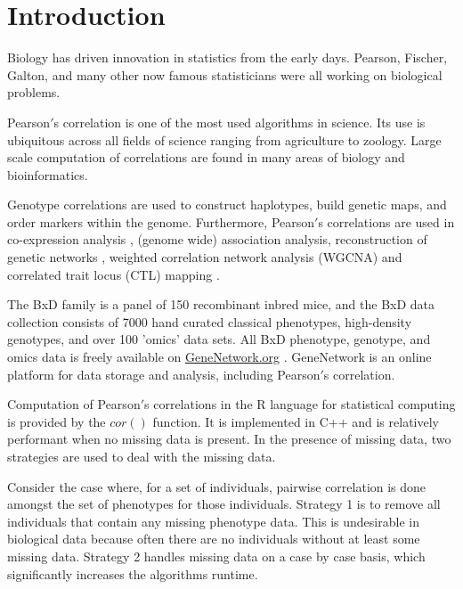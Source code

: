 \documentclass{bioinfo}
\begin{document}
\maketitle

\section{Introduction}
Biology has driven innovation in statistics from the early days. Pearson, Fischer, 
Galton, and many other now famous statisticians were all working on biological 
problems. 

\enlargethispage{12pt}

Pearson$'$s correlation is one of the most used algorithms in science. Its use is 
ubiquitous across all fields of science ranging from agriculture to zoology. Large 
scale computation of correlations are found in many areas of biology and 
bioinformatics. 

Genotype correlations are used to construct haplotypes, build genetic maps, and 
order markers within the genome. Furthermore, Pearson$'$s correlations are used in 
co-expression analysis \citep{Tesson:2010}, (genome wide) association analysis, 
reconstruction of genetic networks \citep{Fukushima:2013}, weighted correlation 
network analysis (WGCNA) \citep{Horvath:2008} and correlated trait locus (CTL) 
mapping \citep{Arends2016a}.

The BxD family is a panel of 150 recombinant inbred mice, and the BxD data collection 
consists of 7000 hand curated classical phenotypes, high-density genotypes, and over 
100 'omics' data sets. All BxD phenotype, genotype, and omics data is freely available on 
\href{https://genenetwork.org/}{GeneNetwork.org} \citep{Sloan2016}. GeneNetwork is an 
online platform for data storage and analysis, including Pearson$'$s correlation.

Computation of Pearson$'$s correlations in the R language for statistical computing 
\citep{R:2005} is provided by the $cor()$ function. It is implemented in C++ and is 
relatively performant when no missing data is present. In the presence of missing 
data, two strategies are used to deal with the missing data.

Consider the case where, for a set of individuals, pairwise correlation is done 
amongst the set of phenotypes for those individuals. Strategy 1 is to remove 
all individuals that contain any missing phenotype data. This is undesirable in 
biological data because often there are no individuals without at least some 
missing data. Strategy 2 handles missing data on a case by case basis, 
which significantly increases the algorithms runtime.
\end{document}
